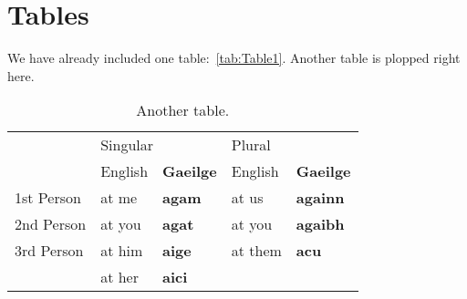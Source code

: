 \section{Tables}
We have already included one table:~\ref{tab:Table1}.  Another table
is plopped right here.
\begin{table}[ht]
  \begin{center}
    \begin{tabular}{|l||l|l||l|l|}
      \hline
      &\multicolumn{2}{l|}{Singular}&\multicolumn{2}{l|}{Plural}\\
      \cline{2-5}
       &English&\textbf{Gaeilge}&English&\textbf{Gaeilge}\\
      \hline\hline
      1st Person&at me&\textbf{agam}&at us&\textbf{againn}\\
      2nd Person&at you&\textbf{agat}&at you&\textbf{agaibh}\\
      3rd Person&at him&\textbf{aige}&at them&\textbf{acu}\\
       &at her&\textbf{aici}& & \\
      \hline
    \end{tabular}
    \caption{
      \label{tab:Table2}
      Another table.}
  \end{center}
\end{table}